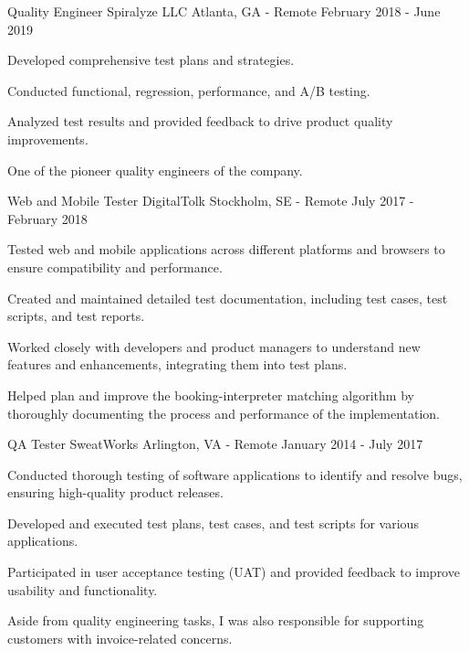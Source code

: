 \begin{cventries}
  \cventry
    {Quality Engineer} %
    {Spiralyze LLC} %
    {Atlanta, GA - Remote} %
    {February 2018 - June 2019} %
    {
      \begin{cvitems} %
        \item {Developed comprehensive test plans and strategies.}
        \item {Conducted functional, regression, performance, and A/B testing.}
        \item {Analyzed test results and provided feedback to drive product quality improvements.}
        \item {One of the pioneer quality engineers of the company.}
      \end{cvitems}
    }

  \cventry
  {Web and Mobile Tester} %
  {DigitalTolk} %
  {Stockholm, SE - Remote} %
  {July 2017 - February 2018} %
  {
    \begin{cvitems} %
      \item {Tested web and mobile applications across different platforms and browsers to ensure compatibility and performance.}
      \item {Created and maintained detailed test documentation, including test cases, test scripts, and test reports.}
      \item {Worked closely with developers and product managers to understand new features and enhancements, integrating them into test plans.}
      \item {Helped plan and improve the booking-interpreter matching algorithm by thoroughly documenting the process and performance of the implementation.}
    \end{cvitems}
  }

  \cventry
    {QA Tester} %
    {SweatWorks} %
    {Arlington, VA - Remote} %
    {January 2014 - July 2017} %
    {
      \begin{cvitems} %
        \item {Conducted thorough testing of software applications to identify and resolve bugs, ensuring high-quality product releases.}
        \item {Developed and executed test plans, test cases, and test scripts for various applications.}
        \item {Participated in user acceptance testing (UAT) and provided feedback to improve usability and functionality.}
        \item {Aside from quality engineering tasks, I was also responsible for supporting customers with invoice-related concerns.}
      \end{cvitems}
    }

\end{cventries}
